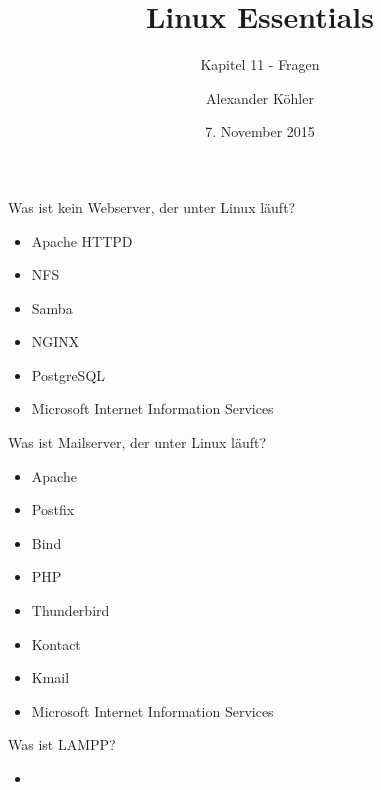 \documentclass[aspectratio=43]{beamer}
\title[Linux Essentials  - Kapitel 11 - Fragen]{Linux Essentials}
\subtitle{Kapitel 11 - Fragen}
\author{Alexander Köhler}
\date{7. November 2015}
\begin{document}
\logoframe

\frame{\titlepage}


\setcounter{tocdepth}{1}
\section[Gliederung]{}
\frame{\tableofcontents}



\begin{frame}{}
  \begin{block}{Was ist kein Webserver, der unter Linux läuft?}
    \begin{itemize}
      \item Apache HTTPD
      \item NFS
      \item Samba
      \item NGINX
      \item PostgreSQL
      \item Microsoft Internet Information Services
    \end{itemize}
  \end{block}
\end{frame}

\begin{frame}{}
  \begin{block}{Was ist Mailserver, der unter Linux läuft?}
    \begin{itemize}
      \item Apache
      \item Postfix
      \item Bind
      \item PHP
      \item Thunderbird
      \item Kontact
      \item Kmail
      \item Microsoft Internet Information Services
    \end{itemize}
  \end{block}
\end{frame}

\begin{frame}{}
  \begin{block}{Was ist LAMPP?}
    \begin{itemize}
      \item 
    \end{itemize}
  \end{block}
\end{frame}
\end{document}
